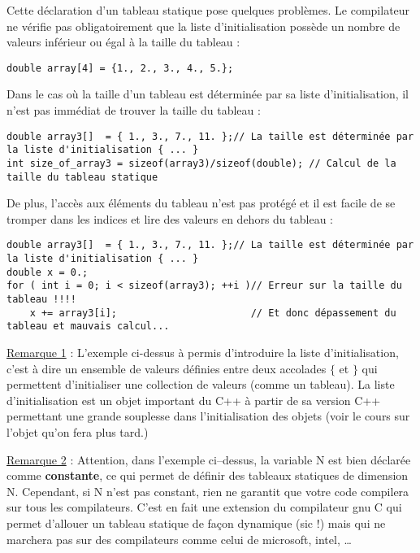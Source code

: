 Cette déclaration d'un tableau statique pose quelques problèmes. Le compilateur ne vérifie pas obligatoirement que la liste d'initialisation possède un nombre de valeurs inférieur ou égal à la taille du tableau :

\begin{lstlisting}
double array[4] = {1., 2., 3., 4., 5.};
\end{lstlisting}

Dans le cas où la taille d'un tableau est déterminée par sa liste d'initialisation, il n'est pas immédiat de trouver la taille du tableau :

\begin{lstlisting}[caption=lire la taille d'un tableau statique en C/C++]
double array3[]  = { 1., 3., 7., 11. };// La taille est déterminée par la liste d'initialisation { ... }
int size_of_array3 = sizeof(array3)/sizeof(double); // Calcul de la taille du tableau statique
\end{lstlisting}

De plus, l'accès aux éléments du tableau n'est pas protégé et il est facile de se tromper dans les indices et lire des valeurs en dehors du tableau :
\begin{lstlisting}[caption=Erreur d'indice]
double array3[]  = { 1., 3., 7., 11. };// La taille est déterminée par la liste d'initialisation { ... }
double x = 0.;
for ( int i = 0; i < sizeof(array3); ++i )// Erreur sur la taille du tableau !!!!
    x += array3[i];                       // Et donc dépassement du tableau et mauvais calcul...
\end{lstlisting}

\underline{Remarque 1} : L'exemple ci-dessus à permis d'introduire la liste d'initialisation, c'est à dire un ensemble de valeurs définies entre deux accolades $\{$ et $\}$ qui permettent d'initialiser une collection de valeurs (comme un tableau). La liste d'initialisation est un objet important du C++ à partir de sa version C++ permettant une grande souplesse dans l'initialisation des objets (voir le cours sur l'objet qu'on fera plus tard.)

\underline{Remarque 2} : Attention, dans l'exemple ci--dessus, la variable N est bien déclarée comme \textbf{constante}, ce qui permet de définir des tableaux statiques de dimension N. Cependant, si N n'est pas constant, rien ne garantit que votre code compilera sur tous les compilateurs. C'est en fait une extension du compilateur gnu C qui permet d'allouer un tableau statique de façon dynamique (sic !) mais qui ne marchera pas sur des compilateurs comme celui de microsoft, intel, \ldots

